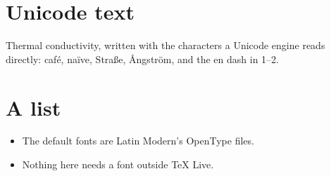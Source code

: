 \documentclass[11pt]{article}
\begin{document}
\section{Unicode text}
Thermal conductivity, written with the characters a Unicode engine reads directly: café, naïve, Straße, Ångström,
and the en dash in 1–2.

\section{A list}
\begin{itemize}
  \item The default fonts are Latin Modern's OpenType files.
  \item Nothing here needs a font outside TeX Live.
\end{itemize}
\end{document}
